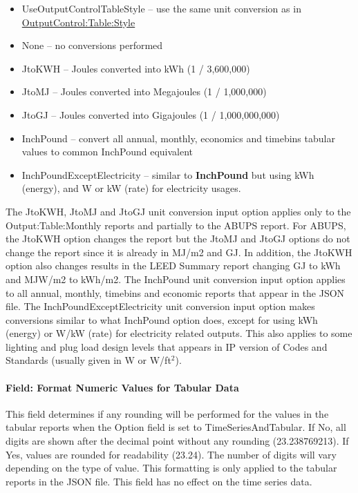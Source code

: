 \begin{itemize}
\item 
UseOutputControlTableStyle -- use the same unit conversion as in   \hyperref[outputcontroltablestyle]{OutputControl:Table:Style}

\item 
None -- no conversions performed
\item 
JtoKWH -- Joules converted into kWh (1 / 3,600,000)
\item 
JtoMJ -- Joules converted into Megajoules (1 / 1,000,000)
\item
JtoGJ -- Joules converted into Gigajoules (1 / 1,000,000,000)
\item 
InchPound -- convert all annual, monthly, economics and timebins tabular values to common InchPound equivalent
\item 
InchPoundExceptElectricity -- similar to \textbf{InchPound} but using kWh (energy), and W or kW (rate) for electricity usages.
\end{itemize}

The JtoKWH, JtoMJ and JtoGJ unit conversion input option applies only to the Output:Table:Monthly reports and partially to the ABUPS report. For ABUPS, the JtoKWH option changes the report but the JtoMJ and JtoGJ options do not change the report since it is already in MJ/m2 and GJ. In addition, the JtoKWH option also changes results in the LEED Summary report changing GJ to kWh and MJW/m2 to kWh/m2. The InchPound unit conversion input option applies to all annual, monthly, timebins and economic reports that appear in the JSON file. The InchPoundExceptElectricity unit conversion input option makes conversions similar to what InchPound option does, except for using kWh (energy) or W/kW (rate) for electricity related outputs. This also applies to some lighting and plug load design levels that appears in IP version of Codes and Standards (usually given in W or W/ft$^2$).

\paragraph{Field: Format Numeric Values for Tabular Data}\label{field-format-numeric-values-for-tabular-data-json}

This field determines if any rounding will be performed for the values in the tabular reports when the Option field is set to TimeSeriesAndTabular. If No, all digits are shown after the decimal point without any rounding (23.238769213). If Yes, values are rounded for readability (23.24). The number of digits will vary depending on the type of value. This formatting is only applied to the tabular reports in the JSON file. This field has no effect on the time series data.

